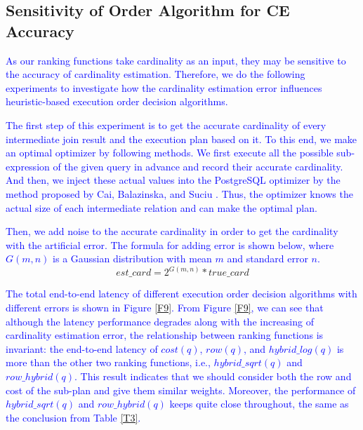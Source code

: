 \subsection{Sensitivity of Order Algorithm for CE Accuracy} \label{S53}
\textcolor{blue}{
    As our ranking functions take cardinality as an input, they may be sensitive to the accuracy of cardinality estimation. Therefore, we do the following experiments to investigate how the cardinality estimation error influences heuristic-based execution order decision algorithms.
}\par
\textcolor{blue}{
    The first step of this experiment is to get the accurate cardinality of every intermediate join result and the execution plan based on it. To this end, we make an optimal optimizer by following methods. We first execute all the possible sub-expression of the given query in advance and record their accurate cardinality. And then, we inject these actual values into the PostgreSQL optimizer by the method proposed by Cai, Balazinska, and Suciu \cite{PessimisticCE}. Thus, the optimizer knows the actual size of each intermediate relation and can make the optimal plan.
}\par
\textcolor{blue}{
    Then, we add noise to the accurate cardinality in order to get the cardinality with the artificial error. The formula for adding error is shown below, where $G(m, n)$ is a Gaussian distribution with mean $m$ and standard error $n$.
}
    $$ est\_card = 2^{G(m, n)} * true\_card $$\par
\textcolor{blue}{
    The total end-to-end latency of different execution order decision algorithms with different errors is shown in Figure \ref{F9}. From Figure \ref{F9}, we can see that although the latency performance degrades along with the increasing of cardinality estimation error, the relationship between ranking functions is invariant: the end-to-end latency of $cost(q)$, $row(q)$, and $hybrid\_log(q)$ is more than the other two ranking functions, i.e., $hybrid\_sqrt(q)$ and $row\_hybrid(q)$. This result indicates that we should consider both the row and cost of the sub-plan and give them similar weights. Moreover, the performance of $hybrid\_sqrt(q)$ and $row\_hybrid(q)$ keeps quite close throughout, the same as the conclusion from Table \ref{T3}.
}
